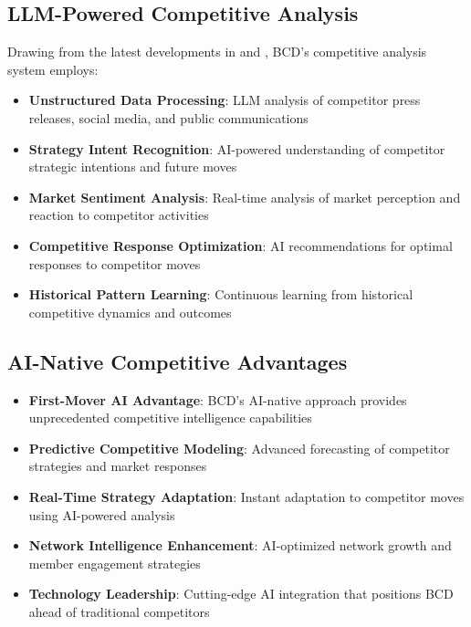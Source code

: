\documentclass[12pt,a4paper]{book}
\begin{document}
\subsection{LLM-Powered Competitive Analysis}

Drawing from the latest developments in \citep{ferede_artificial_intelligence_ai} and \citep{simas_humanai_interaction_an}, BCD's competitive analysis system employs:

\begin{itemize}
    \item \textbf{Unstructured Data Processing}: LLM analysis of competitor press releases, social media, and public communications
    \item \textbf{Strategy Intent Recognition}: AI-powered understanding of competitor strategic intentions and future moves
    \item \textbf{Market Sentiment Analysis}: Real-time analysis of market perception and reaction to competitor activities
    \item \textbf{Competitive Response Optimization}: AI recommendations for optimal responses to competitor moves
    \item \textbf{Historical Pattern Learning}: Continuous learning from historical competitive dynamics and outcomes
\end{itemize}

\subsection{AI-Native Competitive Advantages}

\begin{itemize}
    \item \textbf{First-Mover AI Advantage}: BCD's AI-native approach provides unprecedented competitive intelligence capabilities
    \item \textbf{Predictive Competitive Modeling}: Advanced forecasting of competitor strategies and market responses
    \item \textbf{Real-Time Strategy Adaptation}: Instant adaptation to competitor moves using AI-powered analysis
    \item \textbf{Network Intelligence Enhancement}: AI-optimized network growth and member engagement strategies
    \item \textbf{Technology Leadership}: Cutting-edge AI integration that positions BCD ahead of traditional competitors
\end{itemize}
\end{document}
